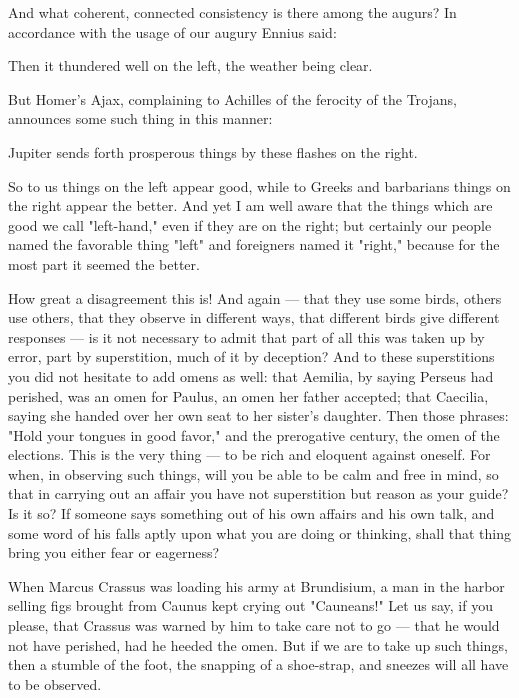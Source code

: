  And what coherent, connected consistency is there among the augurs? In accordance with the usage of our augury Ennius said:

Then it thundered well on the left, the weather being clear.

But Homer's Ajax, complaining to Achilles of the ferocity of the Trojans, announces some such thing in this manner:

Jupiter sends forth prosperous things by these flashes on the right.

So to us things on the left appear good, while to Greeks and barbarians things on the right appear the better. And yet I am well aware that the things which are good we call "left-hand," even if they are on the right; but certainly our people named the favorable thing "left" and foreigners named it "right," because for the most part it seemed the better.

 How great a disagreement this is! And again — that they use some birds, others use others, that they observe in different ways, that different birds give different responses — is it not necessary to admit that part of all this was taken up by error, part by superstition, much of it by deception? And to these superstitions you did not hesitate to add omens as well: that Aemilia, by saying Perseus had perished, was an omen for Paulus, an omen her father accepted; that Caecilia, saying she handed over her own seat to her sister's daughter. Then those phrases: "Hold your tongues in good favor," and the prerogative century, the omen of the elections. This is the very thing — to be rich and eloquent against oneself. For when, in observing such things, will you be able to be calm and free in mind, so that in carrying out an affair you have not superstition but reason as your guide? Is it so? If someone says something out of his own affairs and his own talk, and some word of his falls aptly upon what you are doing or thinking, shall that thing bring you either fear or eagerness?

 When Marcus Crassus was loading his army at Brundisium, a man in the harbor selling figs brought from Caunus kept crying out "Cauneans!" Let us say, if you please, that Crassus was warned by him to take care not to go — that he would not have perished, had he heeded the omen. But if we are to take up such things, then a stumble of the foot, the snapping of a shoe-strap, and sneezes will all have to be observed.

